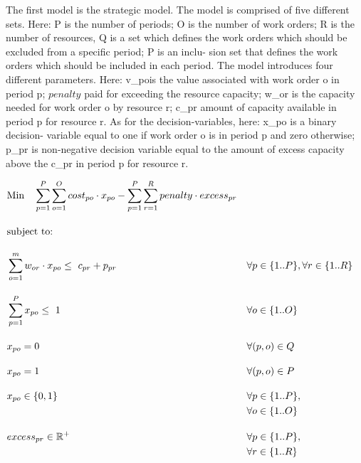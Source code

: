 \documentclass[runningheads]{llncs}
\begin{document}
The first model is the strategic model. The model is comprised of five different sets. Here: P
is the number of periods; O is the number of work
orders; R is the number of resources, Q is a
set which defines the work orders which should
be excluded from a specific period; P is an inclu-
sion set that defines the work orders which should
be included in each period. The model introduces
four different parameters. Here: v_{po}is the value
associated with work order o in period p; $penalty$ paid for exceeding the resource capacity; w_{or} is the capacity needed for work order o
by resource r; c_{pr} amount of capacity
available in period p for resource r. As for the
decision-variables, here: x_{po} is a binary decision-
variable equal to one if work order o is in period
p and zero otherwise; p_{pr} is non-negative decision
variable equal to the amount of excess capacity
above the c_{pr} in period p for resource r.


\begin{alignat}{2}
    &\text{Min} \quad \sum_{p = 1}^{P} \sum_{o = 1}^{O} cost_{po} \cdot x_{po} - \sum_{p = 1}^{P} \sum_{r = 1}^R penalty \cdot excess_{pr} \label{eqn:objective_function_strategic} \\[1em]
    &\text{subject to:} \notag\\[1em]
    &\sum_{o=1}^m w_{or} \cdot x_{po} \leq \ c_{pr} + p_{pr} \quad  && \forall p \in \{1..P\}, \forall r \in \{1..R\}\label{eqn:capacity_constraint} \\[1em]
    &\sum_{p = 1}^{P} x_{po} \leq \ 1 \quad                         && \forall o \in \{1..O\}   \label{eqn:single_workorder_constraint}\\[1em]
    &x_{po} = 0                                                     && \forall (p, o) \in Q \quad  \label{eqn:exclusion_constraint} \\[1em]
    &x_{po} = 1                                                     && \forall (p, o) \in P \quad  \label{eqn:inclusion_constraint}\\[1em]
    &x_{po} \in \{0, 1\}                                            && \forall p \in \{1..P\}, \notag \\
    &&& \forall o \in \{1..O\}                 \label{eqn:x_integrality_constraint}\\[1em] 
    &excess_{pr} \in \mathbb{R}^{+}                                      && \forall p \in \{1..P\}, \notag \\
    &&&\forall r \in \{1..R\}                  \label{eqn:p_non_negativity_constraint}
\end{alignat}
\end{document}
